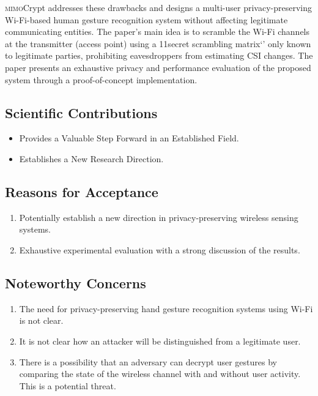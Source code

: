 \documentclass[conference,compsoc]{IEEEtran}
\newcommand{\sname}{\textsc{mimo}Crypt\xspace}
\begin{document}
\sname addresses these drawbacks and designs a multi-user privacy-preserving Wi-Fi-based human gesture recognition system without affecting legitimate communicating entities. The paper's main idea is to scramble the Wi-Fi channels at the transmitter (access point) using a 11secret scrambling matrix‘’ only known to legitimate parties, prohibiting eavesdroppers from estimating CSI changes. The paper presents an exhaustive privacy and performance evaluation of the proposed system through a proof-of-concept implementation.

\subsection*{Scientific Contributions}
\begin{itemize}
\item %
Provides a Valuable Step Forward in an Established Field.
\vspace{.5ex}
\item %
Establishes a New Research Direction.
\vspace{.5ex}
\end{itemize}

\subsection*{Reasons for Acceptance}
\begin{enumerate}
\item Potentially establish a new direction in privacy-preserving wireless sensing systems.
\vspace{.5ex}
\item Exhaustive experimental evaluation with a strong discussion of the results.
\end{enumerate}

\subsection*{Noteworthy Concerns}
\begin{enumerate} 
\item The need for privacy-preserving hand gesture recognition systems using Wi-Fi is not clear.
\vspace{.5ex}
\item It is not clear how an attacker will be distinguished from a legitimate user.
\vspace{.5ex}
\item There is a possibility that an adversary can decrypt user gestures by comparing the state of the wireless channel with and without user activity. This is a potential threat.
\end{enumerate}
\end{document}
